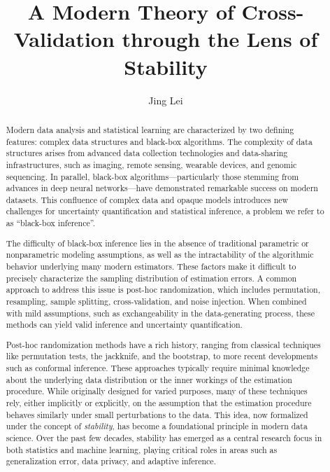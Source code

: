 \documentclass[11pt]{article}
\theoremstyle{plain}
\begin{document}
\allowdisplaybreaks
\title{A Modern Theory of Cross-Validation through the Lens of Stability}

\author[1]{Jing Lei}


\maketitle

\begin{abstract}
Modern data analysis and statistical learning are characterized by two defining features: complex data structures and black-box algorithms. The complexity of data structures arises from advanced data collection technologies and data-sharing infrastructures, such as imaging, remote sensing, wearable devices, and genomic sequencing. In parallel, black-box algorithms—particularly those stemming from advances in deep neural networks—have demonstrated remarkable success on modern datasets. This confluence of complex data and opaque models introduces new challenges for uncertainty quantification and statistical inference, a problem we refer to as ``black-box inference''.

The difficulty of black-box inference lies in the absence of traditional parametric or nonparametric modeling assumptions, as well as the intractability of the algorithmic behavior underlying many modern estimators. These factors make it difficult to precisely characterize the sampling distribution of estimation errors. A common approach to address this issue is post-hoc randomization, which includes permutation, resampling, sample splitting, cross-validation, and noise injection. When combined with mild assumptions, such as exchangeability in the data-generating process, these methods can yield valid inference and uncertainty quantification.

Post-hoc randomization methods have a rich history, ranging from classical techniques like permutation tests, the jackknife, and the bootstrap, to more recent developments such as conformal inference. These approaches typically require minimal knowledge about the underlying data distribution or the inner workings of the estimation procedure. While originally designed for varied purposes, many of these techniques rely, either implicitly or explicitly, on the assumption that the estimation procedure behaves similarly under small perturbations to the data. This idea, now formalized under the concept of \emph{stability}, has become a foundational principle in modern data science. Over the past few decades, stability has emerged as a central research focus in both statistics and machine learning, playing critical roles in areas such as generalization error, data privacy, and adaptive inference.


\end{abstract}
\end{document}
